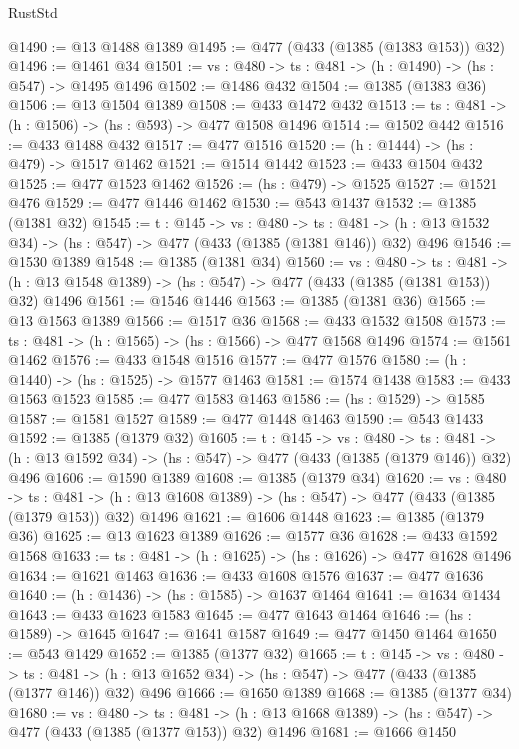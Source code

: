 \begin{lexlean}{RustStd}
\begin{coremodule}
{\begin{coremodule}
{{{{{{{{{{{{{{{{@1490 := @13 @1488 @1389
@1495 := @477 (@433 (@1385 (@1383 @153)) @32)
@1496 := @1461 @34
@1501 := {vs : @480} -> {ts : @481} -> (h : @1490) -> (hs : @547) -> @1495 @1496
@1502 := @1486 @432
@1504 := @1385 (@1383 @36)
@1506 := @13 @1504 @1389
@1508 := @433 @1472 @432
@1513 := {ts : @481} -> (h : @1506) -> (hs : @593) -> @477 @1508 @1496
@1514 := @1502 @442
@1516 := @433 @1488 @432
@1517 := @477 @1516
@1520 := (h : @1444) -> (hs : @479) -> @1517 @1462
@1521 := @1514 @1442
@1523 := @433 @1504 @432
@1525 := @477 @1523 @1462
@1526 := (hs : @479) -> @1525
@1527 := @1521 @476
@1529 := @477 @1446 @1462
@1530 := @543 @1437
@1532 := @1385 (@1381 @32)
@1545 := {t : @145} ->
  {vs : @480} ->
  {ts : @481} -> (h : @13 @1532 @34) -> (hs : @547) -> @477 (@433 (@1385 (@1381 @146)) @32) @496
@1546 := @1530 @1389
@1548 := @1385 (@1381 @34)
@1560 := {vs : @480} ->
  {ts : @481} -> (h : @13 @1548 @1389) -> (hs : @547) -> @477 (@433 (@1385 (@1381 @153)) @32) @1496
@1561 := @1546 @1446
@1563 := @1385 (@1381 @36)
@1565 := @13 @1563 @1389
@1566 := @1517 @36
@1568 := @433 @1532 @1508
@1573 := {ts : @481} -> (h : @1565) -> (hs : @1566) -> @477 @1568 @1496
@1574 := @1561 @1462
@1576 := @433 @1548 @1516
@1577 := @477 @1576
@1580 := (h : @1440) -> (hs : @1525) -> @1577 @1463
@1581 := @1574 @1438
@1583 := @433 @1563 @1523
@1585 := @477 @1583 @1463
@1586 := (hs : @1529) -> @1585
@1587 := @1581 @1527
@1589 := @477 @1448 @1463
@1590 := @543 @1433
@1592 := @1385 (@1379 @32)
@1605 := {t : @145} ->
  {vs : @480} ->
  {ts : @481} -> (h : @13 @1592 @34) -> (hs : @547) -> @477 (@433 (@1385 (@1379 @146)) @32) @496
@1606 := @1590 @1389
@1608 := @1385 (@1379 @34)
@1620 := {vs : @480} ->
  {ts : @481} -> (h : @13 @1608 @1389) -> (hs : @547) -> @477 (@433 (@1385 (@1379 @153)) @32) @1496
@1621 := @1606 @1448
@1623 := @1385 (@1379 @36)
@1625 := @13 @1623 @1389
@1626 := @1577 @36
@1628 := @433 @1592 @1568
@1633 := {ts : @481} -> (h : @1625) -> (hs : @1626) -> @477 @1628 @1496
@1634 := @1621 @1463
@1636 := @433 @1608 @1576
@1637 := @477 @1636
@1640 := (h : @1436) -> (hs : @1585) -> @1637 @1464
@1641 := @1634 @1434
@1643 := @433 @1623 @1583
@1645 := @477 @1643 @1464
@1646 := (hs : @1589) -> @1645
@1647 := @1641 @1587
@1649 := @477 @1450 @1464
@1650 := @543 @1429
@1652 := @1385 (@1377 @32)
@1665 := {t : @145} ->
  {vs : @480} ->
  {ts : @481} -> (h : @13 @1652 @34) -> (hs : @547) -> @477 (@433 (@1385 (@1377 @146)) @32) @496
@1666 := @1650 @1389
@1668 := @1385 (@1377 @34)
@1680 := {vs : @480} ->
  {ts : @481} -> (h : @13 @1668 @1389) -> (hs : @547) -> @477 (@433 (@1385 (@1377 @153)) @32) @1496
@1681 := @1666 @1450
}}}}}}}}}}}}}}}}
\end{coremodule}}
\end{coremodule}
\end{lexlean}
